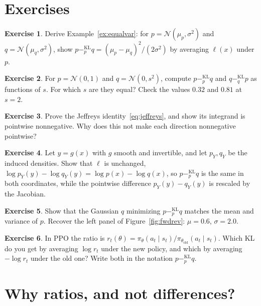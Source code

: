 \documentclass[11pt,oneside]{book}
\newcommand{\kl}[1]{\mathbin{-^{\mathrm{KL}}_{#1}}}       %
\theoremstyle{definition}
\newtheorem{exercise}{Exercise}[chapter]
\theoremstyle{plain}
\theoremstyle{remark}
\begin{document}
\section*{Exercises}

\begin{exercise}
Derive Example~\ref{ex:equalvar}: for $p=\mathcal N(\mu_p,\sigma^2)$ and $q=\mathcal N(\mu_q,\sigma^2)$, show
$p\kl{p}q=(\mu_p-\mu_q)^2/(2\sigma^2)$ by averaging $\ell(x)$ under $p$.
\end{exercise}

\begin{exercise}
For $p=\mathcal N(0,1)$ and $q=\mathcal N(0,s^2)$, compute $p\kl{p}q$ and $q\kl{q}p$ as functions of $s$. For which $s$
are they equal? Check the values $0.32$ and $0.81$ at $s=2$.
\end{exercise}

\begin{exercise}
Prove the Jeffreys identity~\eqref{eq:jeffreys}, and show its integrand is pointwise nonnegative. Why does this not
make each direction nonnegative pointwise?
\end{exercise}

\begin{exercise}
Let $y=g(x)$ with $g$ smooth and invertible, and let $p_Y,q_Y$ be the induced densities. Show that
$\ell$ is unchanged, $\log p_Y(y)-\log q_Y(y)=\log p(x)-\log q(x)$, so $p\kl{p}q$ is the same in both coordinates,
while the pointwise difference $p_Y(y)-q_Y(y)$ is rescaled by the Jacobian.
\end{exercise}

\begin{exercise}
Show that the Gaussian $q$ minimizing $p\kl{p}q$ matches the mean and variance of $p$. Recover the left panel of
Figure~\ref{fig:fwdrev}: $\mu=0.6$, $\sigma=2.0$.
\end{exercise}

\begin{exercise}
In PPO the ratio is $r_t(\theta)=\pi_\theta(a_t\mid s_t)/\pi_{\theta_{\mathrm{old}}}(a_t\mid s_t)$. Which KL do you get by
averaging $\log r_t$ under the new policy, and which by averaging $-\log r_t$ under the old one? Write both in the
notation $p\kl{p}q$.
\end{exercise}

\appendix
\renewcommand{\thesection}{\Alph{section}}
\renewcommand{\thefigure}{\Alph{section}.\arabic{figure}}
\setcounter{figure}{0}

\section{Why ratios, and not differences?}\label{app:ratios}
\end{document}

